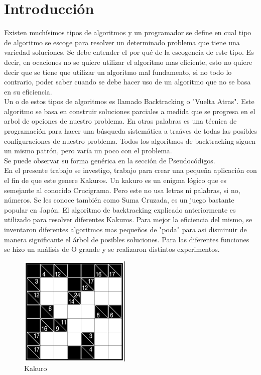 \documentclass[conference]{IEEEtran}
\begin{document}
\section{Introducci\'on}
Existen much\'isimos tipos de algoritmos y un programador se define en cual tipo de algoritmo se escoge para resolver un determinado problema que tiene una variedad soluciones. Se debe entender el por qu\'e de la escogencia de este tipo. Es decir, en ocaciones no se quiere utilizar el algoritmo mas eficiente, esto no quiere decir que se tiene que utilizar un algoritmo mal fundamento, si no todo lo contrario, poder saber cuando se debe hacer uso de un algoritmo que no se basa en su eficiencia.\\
Un o de estos tipos de algoritmos es llamado Backtracking o "Vuelta Atras". Este algoritmo se basa en construir soluciones parciales a medida que se progresa en el arbol de opciones de nuestro problema.  En otras palabras es una t\'ecnica de programaci\'on para hacer una b\'usqueda sistem\'atica a tra\'aves de todas las posibles configuraciones de nuestro problema. Todos los algoritmos de backtracking siguen un mismo patr\'on, pero var\'ia un poco con el problema. \\Se puede observar su forma gen\'erica en la secci\'on de Pseudoc\'odigos.
\\
En el presente trabajo se investigo, trabajo para crear una pequeña aplicaci\'on con el fin de que este genere Kakuros.  Un kakuro es un enigma l\'ogico que es semejante al conocido Crucigrama. Pero este no usa letras ni palabras, si no, n\'umeros. Se les conoce tambi\'en como Suma Cruzada, es un juego bastante popular en Jap\'on. 
El algoritmo de backtracking explicado anteriormente es utilizado para resolver diferentes Kakuros. Para mejor la eficiencia del mismo, se inventaron diferentes algoritmos mas pequeños de "poda" para asi disminuir de manera significante el \'arbol de posibles soluciones.  Para las diferentes funciones se hizo un an\'alisis de O grande y se realizaron distintos experimentos.
\begin{figure}
	\includegraphics[scale=0.5]{kakuroImg.png}
	\caption{Kakuro}
\end{figure}
\end{document}
